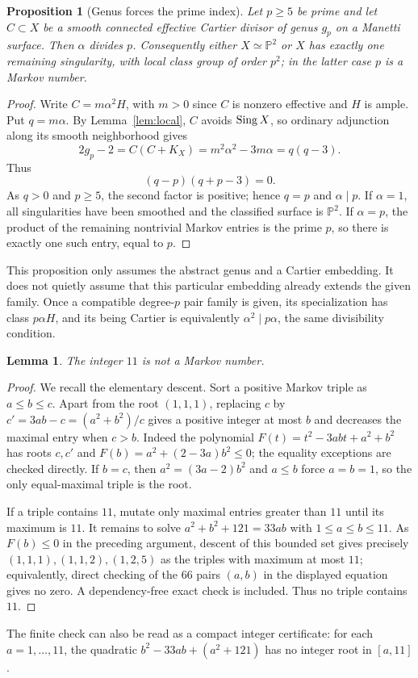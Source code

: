 \documentclass[11pt]{article}
\newtheorem{proposition}[theorem]{Proposition}
\newtheorem{lemma}[theorem]{Lemma}
\theoremstyle{remark}\newtheorem{remark}[theorem]{Remark}
\newcommand{\PP}{\mathbb P}\newcommand{\CC}{\mathbb C}\newcommand{\ZZ}{\mathbb Z}
\begin{document}
\begin{proposition}[Genus forces the prime index]\label{prop:index}
Let $p\geq5$ be prime and let $C\subset X$ be a smooth connected effective Cartier divisor of genus $g_p$ on a Manetti surface. Then $\alpha$ divides $p$. Consequently either $X\simeq\PP^2$ or $X$ has exactly one remaining singularity, with local class group of order $p^2$; in the latter case $p$ is a Markov number.
\end{proposition}
\begin{proof}
Write $C=m\alpha^2H$, with $m>0$ since $C$ is nonzero effective and $H$ is ample. Put $q=m\alpha$. By Lemma~\ref{lem:local}, $C$ avoids $\operatorname{Sing} X$, so ordinary adjunction along its smooth neighborhood gives
\[
 2g_p-2=C(C+K_X)=m^2\alpha^2-3m\alpha=q(q-3).
\]
Thus
\[
 (q-p)(q+p-3)=0.
\]
As $q>0$ and $p\geq5$, the second factor is positive; hence $q=p$ and $\alpha\mid p$. If $\alpha=1$, all singularities have been smoothed and the classified surface is $\PP^2$. If $\alpha=p$, the product of the remaining nontrivial Markov entries is the prime $p$, so there is exactly one such entry, equal to $p$.
\end{proof}
This proposition only assumes the abstract genus and a Cartier embedding. It does not quietly assume that this particular embedding already extends the given family. Once a compatible degree-$p$ pair family is given, its specialization has class $p\alpha H$, and its being Cartier is equivalently $\alpha^2\mid p\alpha$, the same divisibility condition.

\begin{lemma}
The integer $11$ is not a Markov number.
\end{lemma}
\begin{proof}
We recall the elementary descent. Sort a positive Markov triple as $a\leq b\leq c$. Apart from the root $(1,1,1)$, replacing $c$ by $c'=3ab-c=(a^2+b^2)/c$ gives a positive integer at most $b$ and decreases the maximal entry when $c>b$. Indeed the polynomial $F(t)=t^2-3abt+a^2+b^2$ has roots $c,c'$ and $F(b)=a^2+(2-3a)b^2\leq0$; the equality exceptions are checked directly. If $b=c$, then $a^2=(3a-2)b^2$ and $a\leq b$ force $a=b=1$, so the only equal-maximal triple is the root.

If a triple contains $11$, mutate only maximal entries greater than $11$ until its maximum is $11$. It remains to solve
$a^2+b^2+121=33ab$ with $1\leq a\leq b\leq11$. As $F(b)\leq0$ in the preceding argument, descent of this bounded set gives precisely $(1,1,1),(1,1,2),(1,2,5)$ as the triples with maximum at most $11$; equivalently, direct checking of the $66$ pairs $(a,b)$ in the displayed equation gives no zero. A dependency-free exact check is included. Thus no triple contains $11$.
\end{proof}
The finite check can also be read as a compact integer certificate: for each $a=1,\ldots,11$, the quadratic $b^2-33ab+(a^2+121)$ has no integer root in $[a,11]$.
\end{document}
